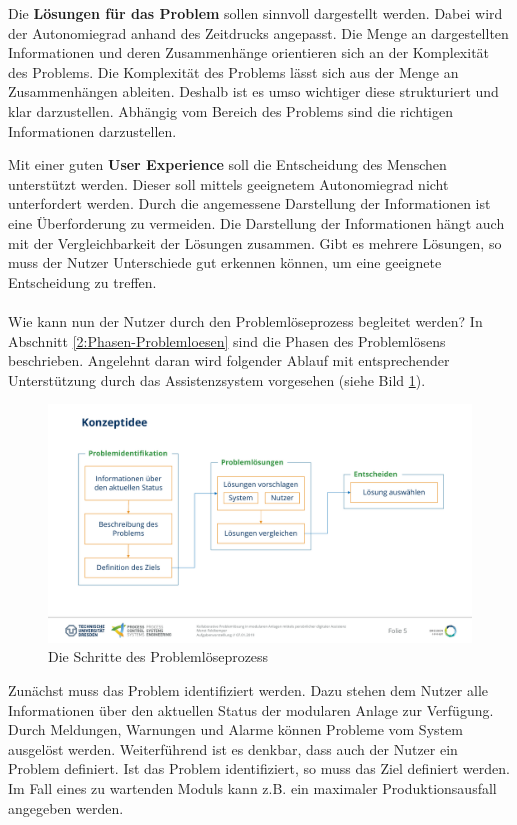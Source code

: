 Die \textbf{Lösungen für das Problem} sollen sinnvoll dargestellt werden. Dabei wird der Autonomiegrad anhand des Zeitdrucks angepasst. Die Menge an dargestellten Informationen und deren Zusammenhänge orientieren sich an der Komplexität des Problems. Die Komplexität des Problems lässt sich aus der Menge an Zusammenhängen ableiten. Deshalb ist es umso wichtiger diese strukturiert und klar darzustellen. Abhängig vom Bereich des Problems sind die richtigen Informationen darzustellen.

Mit einer guten \textbf{User Experience} soll die Entscheidung des Menschen unterstützt werden. Dieser soll mittels geeignetem Autonomiegrad nicht unterfordert werden. Durch die angemessene Darstellung der Informationen ist eine Überforderung zu vermeiden. Die Darstellung der Informationen hängt auch mit der Vergleichbarkeit der Lösungen zusammen. Gibt es mehrere Lösungen, so muss der Nutzer Unterschiede gut erkennen können, um eine geeignete Entscheidung zu treffen.
\\ \\
Wie kann nun der Nutzer durch den Problemlöseprozess begleitet werden? In Abschnitt \ref{2:Phasen-Problemloesen} sind die Phasen des Problemlösens beschrieben. Angelehnt daran wird folgender Ablauf mit entsprechender Unterstützung durch das Assistenzsystem vorgesehen (siehe Bild \ref{pic:Konzeptidee}).
\begin{figure}[htbp]
\centering
\includegraphics[scale=0.45]{DA_files/Bilder/Konzept/Konzeptidee.pdf}
\caption{Die Schritte des Problemlöseprozess}
\label{pic:Konzeptidee}
\end{figure}

Zunächst muss das Problem identifiziert werden. Dazu stehen dem Nutzer alle Informationen über den aktuellen Status der modularen Anlage zur Verfügung. Durch Meldungen, Warnungen und Alarme können Probleme vom System ausgelöst werden. Weiterführend ist es denkbar, dass auch der Nutzer ein Problem definiert. Ist das Problem identifiziert, so muss das Ziel definiert werden. Im Fall eines zu wartenden Moduls kann z.B. ein maximaler Produktionsausfall angegeben werden.

